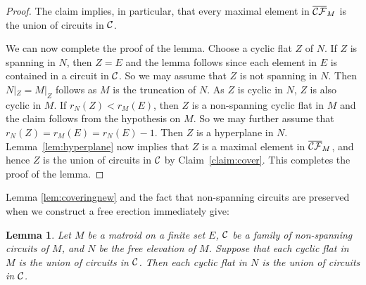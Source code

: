 \documentclass{daj}
\newtheorem{lemma}[thm]{Lemma}\theoremstyle{plain}
\begin{document}
\begin{proof}
The claim implies,  in particular,  that every maximal element in $\overline{\cal CF}_M$ is the union of circuits in ${\cal C}$.

We can now  complete the proof of the lemma.
Choose a cyclic flat $Z$ of $N$.
If $Z$ is spanning in $N$, then $Z=E$ and the lemma follows  since each element in $E$ is contained in a circuit in ${\cal C}$.
So we may assume that $Z$ is not spanning in $N$.
Then $N|_Z = M|_Z$ follows as $M$ is the truncation of $N$.
As $Z$ is cyclic in $N$, $Z$ is also cyclic in $M$.
If $r_{N}(Z)<r_{M}(E)$, then $Z$ is a non-spanning cyclic flat in $M$ and the claim follows from the hypothesis on $M$. So we may further assume that $r_{N}(Z)=r_{M}(E)=r_{N}(E)-1$.
Then $Z$  is a hyperplane in $N$.
Lemma~\ref{lem:hyperplane} now implies that $Z$ is a maximal element in $\overline{\cal CF}_M$, and hence 
 $Z$ is the union of circuits in ${\cal C}$ by  Claim~\ref{claim:cover}.
This completes the proof of the lemma.
\end{proof}

Lemma \ref{lem:coveringnew} and the fact that non-spanning circuits are preserved when we construct a free erection immediately give:

\begin{lemma}\label{lem:covering}
Let $M$ be a matroid on a finite set $E$, ${\cal C}$ be a family of  non-spanning circuits of $M$, and $N$ be the free elevation of  $M$.
Suppose that each cyclic flat in $M$ is the union of circuits in ${\cal C}$.
Then each cyclic flat in $N$ is the union of circuits in ${\cal C}$.
\end{lemma}
\end{document}
